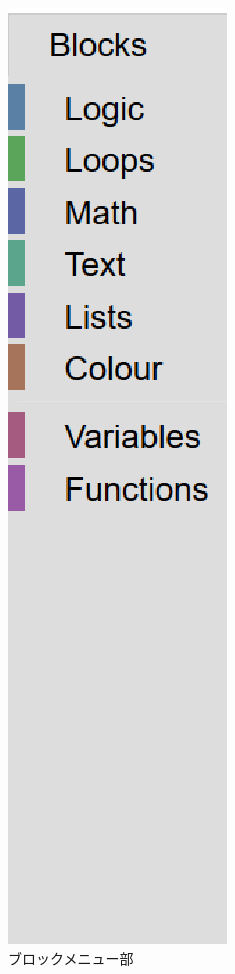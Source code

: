 \documentclass{risepaper}
\begin{document}
\begin{figure}[h]
\begin{center}
\includegraphics[scale=0.3]{img/blockmenu.eps}
\caption{ブロックメニュー部}%
\label{fig:blockmenu}
\end{center}%
\end{figure}%
\end{document}
